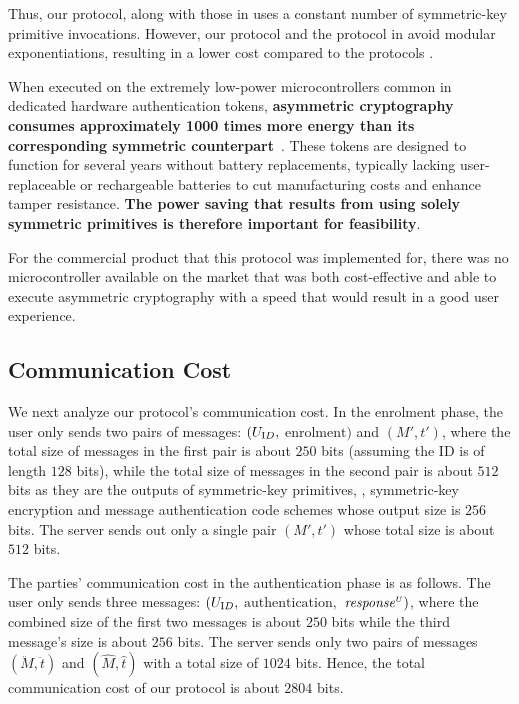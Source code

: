 Thus,  our protocol, along with those in \cite{WangW18,JareckiJKSS21,MatsuoMY11} uses a constant number of symmetric-key primitive invocations. However, our protocol and the protocol in \cite{MatsuoMY11} avoid modular exponentiations, resulting in a lower cost compared to the protocols  \cite{WangW18,JareckiJKSS21}.

When executed on the extremely low-power microcontrollers common in dedicated hardware authentication tokens, \textbf{asymmetric cryptography consumes approximately 1000 times more energy than its corresponding symmetric counterpart}~\cite{energyconsumption}. These tokens are designed to function for several years without battery replacements, typically lacking user-replaceable or rechargeable batteries to cut manufacturing costs and enhance tamper resistance. \textbf{The power saving that results from using solely symmetric primitives is therefore important for feasibility}. 

For the commercial product that this protocol was implemented for, there was no microcontroller available on the market that was both cost-effective and able to execute asymmetric cryptography with a speed that would result in a good user experience.

\subsection{Communication Cost}


We next analyze our protocol's communication cost. In the enrolment phase,  the user only sends two pairs of messages: $(U_{\text ID}, $ $\text{enrolment})$ and $(M', t')$, where the total size of messages in the first pair is about $250$ bits (assuming the ID is of length $128$ bits),  while the total size of messages in the second pair is about  $512$ bits as they are the outputs of symmetric-key primitives, \ie, symmetric-key encryption and message authentication code schemes whose output size is $256$ bits. The server sends out only a single pair $(M', t')$ whose total size is about $512$ bits. 

The parties' communication cost in the authentication phase is as follows. The user only sends three messages: $(U_{\text ID}, $ $\text{authentication}, $ $\mathit{response}^{\scriptscriptstyle U})$, where the combined size of the first two messages is about $250$ bits while the third message's size is about $256$ bits. The server sends only two pairs of messages $(\ddot M, \ddot t)$ and $(\hat M, \hat t)$ with a total size of $1024$ bits. Hence, the total communication cost of our protocol is about $2804$ bits. 

